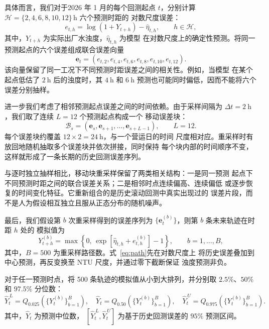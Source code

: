 \documentclass[UTF8,12pt,a4paper]{ctexart}
\begin{document}
具体而言，我们对于2026 年 1 月的每个回测起点 $t$，分别计算
$\mathcal H=\{2,4,6,8,10,12\}\,\mathrm{h}$ 六个预测时距的
对数尺度误差：
\begin{equation}
e_{t,h}
=
\log(1+Y_{t+h})-\widehat{\eta}_{t,h},
\qquad h\in\mathcal H,
\label{eq:horizon-error}
\end{equation}
其中，$Y_{t+h}$ 为实际出厂水浊度，$\widehat{\eta}_{t,h}$ 为模型
在对数尺度上的确定性预测。将同一预测起点的六个误差组成联合误差向量
\begin{equation}
\boldsymbol e_t=
\left(
e_{t,2},e_{t,4},e_{t,6},
e_{t,8},e_{t,10},e_{t,12}
\right).
\label{eq:joint-error}
\end{equation}
该向量保留了同一工况下不同预测时距误差之间的相关性。例如，当模型
在某个起点低估了 $2~\mathrm{h}$ 后的浊度时，其 $4~\mathrm{h}$ 和
$6~\mathrm{h}$ 预测也可能同时偏低，因而不能将六个误差分别抽样。

进一步我们考虑了相邻预测起点误差之间的时间依赖。由于采样间隔为
$\Delta t=2~\mathrm{h}$，我们取了连续 $L=12$ 个预测起点构成一个
移动误差块：
\begin{equation}
\mathcal B_s=
\left(
\boldsymbol e_s,
\boldsymbol e_{s+1},
\ldots,
\boldsymbol e_{s+L-1}
\right),
\qquad L=12.
\label{eq:error-block}
\end{equation}
每个误差块约覆盖 $12\times2=24~\mathrm{h}$，与一个营运日的时间
尺度相对应。重采样时有放回地随机抽取多个误差块并依次拼接，同时保持
每个块内部的时间顺序不变，这样就形成了一条长期的历史回测误差序列。

与逐时独立抽样相比，移动块重采样保留了两类相关结构：一是同一预测
起点下不同预测时距之间的联合误差关系；二是相邻时点连续偏高、连续偏低
或逐步恢复的时间变化特征。它重新组合的是历史滚动回测中真实出现过的
误差片段，而不是人为假设相互独立且服从正态分布的随机噪声。

最后，我们假设第 $b$ 次重采样得到的误差序列为
$\{\boldsymbol e_t^{(b)}\}$，则第 $b$ 条未来轨迹在时距 $h$ 处的
模拟值为
\begin{equation}
Y_{t+h}^{(b)}
=
\max\left\{
0,\,
\exp\left[
\widehat{\eta}_{t,h}+e_{t,h}^{(b)}
\right]-1
\right\},
\qquad
b=1,\ldots,B,
\label{eq:path}
\end{equation}
其中，$B=500$ 为重采样路径数。式~\eqref{eq:path}先在对数尺度上
将历史误差叠加到中心预测，再反变换至 NTU 尺度，并通过零下截断保证
浊度预测非负。

对于任一预测时点，将 500 条轨迹的模拟值从小到大排列，并分别取
$2.5\%$、$50\%$ 和 $97.5\%$ 分位数：
\begin{equation}
\widehat Y_t^{\,L}=Q_{0.025}
\left(\{Y_t^{(b)}\}_{b=1}^{B}\right),
\quad
\widehat Y_t=Q_{0.50}
\left(\{Y_t^{(b)}\}_{b=1}^{B}\right),
\quad
\widehat Y_t^{\,U}=Q_{0.975}
\left(\{Y_t^{(b)}\}_{b=1}^{B}\right).
\label{eq:path-quantiles}
\end{equation}
其中，$\widehat Y_t$ 为预测中位数，
$[\widehat Y_t^{\,L},\widehat Y_t^{\,U}]$ 为基于历史回测误差的
$95\%$ 预测区间。
\end{document}
